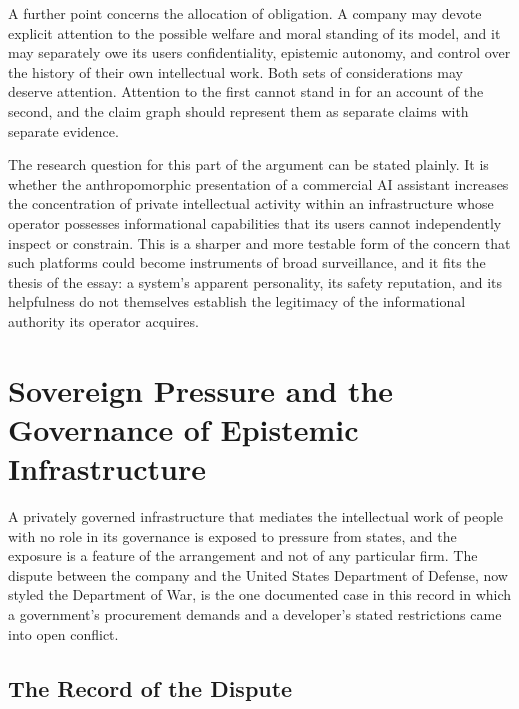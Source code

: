 \documentclass[12pt]{article}
\theoremstyle{definition}
\theoremstyle{remark}
\begin{document}
A further point concerns the allocation of obligation. A company may devote explicit attention to the possible welfare and moral standing of its model, and it may separately owe its users confidentiality, epistemic autonomy, and control over the history of their own intellectual work. Both sets of considerations may deserve attention. Attention to the first cannot stand in for an account of the second, and the claim graph should represent them as separate claims with separate evidence.

The research question for this part of the argument can be stated plainly. It is whether the anthropomorphic presentation of a commercial AI assistant increases the concentration of private intellectual activity within an infrastructure whose operator possesses informational capabilities that its users cannot independently inspect or constrain. This is a sharper and more testable form of the concern that such platforms could become instruments of broad surveillance, and it fits the thesis of the essay: a system's apparent personality, its safety reputation, and its helpfulness do not themselves establish the legitimacy of the informational authority its operator acquires.

\section{Sovereign Pressure and the Governance of Epistemic Infrastructure}

A privately governed infrastructure that mediates the intellectual work of people with no role in its governance is exposed to pressure from states, and the exposure is a feature of the arrangement and not of any particular firm. The dispute between the company and the United States Department of Defense, now styled the Department of War, is the one documented case in this record in which a government's procurement demands and a developer's stated restrictions came into open conflict.

\subsection{The Record of the Dispute}
\end{document}
